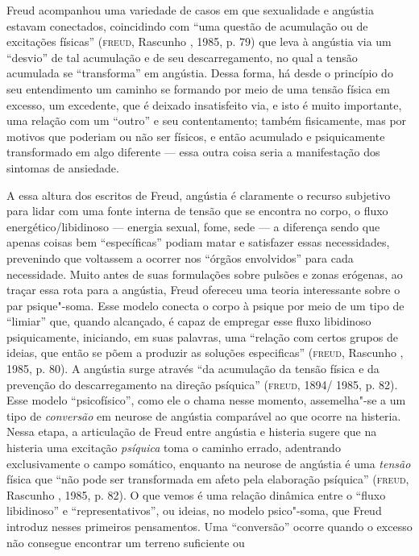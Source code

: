 Freud acompanhou uma variedade de casos em que sexualidade e angústia
estavam conectados, coincidindo com ``uma questão de acumulação ou de
excitações físicas'' (\textsc{freud}, Rascunho , 1985, p. 79) que leva à
angústia via um ``desvio'' de tal acumulação e de seu descarregamento,
no qual a tensão acumulada se ``transforma'' em angústia. Dessa forma,
há desde o princípio do seu entendimento um caminho se formando por meio
de uma tensão física em excesso, um excedente, que é deixado
insatisfeito via, e isto é muito importante, uma relação com um
``outro'' e seu contentamento; também fisicamente, mas por motivos que
poderiam ou não ser físicos, e então acumulado e psiquicamente
transformado em algo diferente --- essa outra coisa seria a manifestação
dos sintomas de ansiedade.

A essa altura dos escritos de Freud, angústia é claramente o recurso
subjetivo para lidar com uma fonte interna de tensão que se encontra no
corpo, o fluxo energético/libidinoso --- energia sexual, fome, sede --- a
diferença sendo que apenas coisas bem ``específicas'' podiam matar e
satisfazer essas necessidades, prevenindo que voltassem a ocorrer nos
``órgãos envolvidos'' para cada necessidade. Muito antes de suas
formulações sobre pulsões e zonas erógenas, ao traçar essa rota para a
angústia, Freud ofereceu uma teoria interessante sobre o par
psique"-soma. Esse modelo conecta o corpo à psique por meio de um tipo de
``limiar'' que, quando alcançado, é capaz de empregar esse fluxo
libidinoso psiquicamente, iniciando, em suas palavras, uma ``relação com
certos grupos de ideias, que então se põem a produzir as soluções
especificas'' (\textsc{freud}, Rascunho , 1985, p. 80). A angústia surge
através ``da acumulação da tensão física e da prevenção do
descarregamento na direção psíquica'' (\textsc{freud}, 1894/ 1985, p. 82). Esse
modelo ``psicofísico'', como ele o chama nesse momento, assemelha"-se a
um tipo de \emph{conversão} em neurose de angústia comparável ao que
ocorre na histeria. Nessa etapa, a articulação de Freud entre angústia e
histeria sugere que na histeria uma excitação \emph{psíquica} toma o
caminho errado, adentrando exclusivamente o campo somático, enquanto na
neurose de angústia é uma \emph{tensão} física que ``não pode ser
transformada em afeto pela elaboração psíquica'' (\textsc{freud}, Rascunho ,
1985, p. 82). O que vemos é uma relação dinâmica entre o ``fluxo
libidinoso'' e ``representativos'', ou ideias, no modelo psico"-soma,
que Freud introduz nesses primeiros pensamentos. Uma ``conversão''
ocorre quando o excesso não consegue encontrar um terreno suficiente ou
